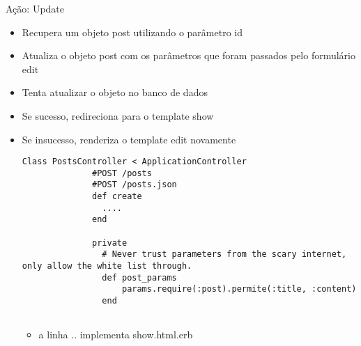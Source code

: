 \begin{frame}{Ação: Update}
	\begin{itemize}
		\item Recupera um objeto \alert{post} utilizando o parâmetro \alert{id}	
		\item Atualiza o objeto \alert{post} com os parâmetros que foram passados pelo
			formulário \alert{edit}
		\item Tenta \alert{atualizar} o objeto no \alert{banco de dados}
		\item Se sucesso, redireciona para o template \alert{show}
		\item Se insucesso, renderiza o template \alert{edit} novamente
		\begin{lstlisting}[style=RubyInputStyle, caption=posts_controller.rb]
			Class PostsController < ApplicationController
			  #POST /posts
			  #POST /posts.json 
			  def create
			    ....
			  end 
				
			  private 
			    # Never trust parameters from the scary internet, only allow the white list through.
			    def post_params 
			    	params.require(:post).permite(:title, :content)
			    end 
				
		\end{lstlisting}		
		\begin{itemize}
			\item a linha .. implementa \alert{show.html.erb}
		\end{itemize}
				
	\end{itemize}	
\end{frame}


